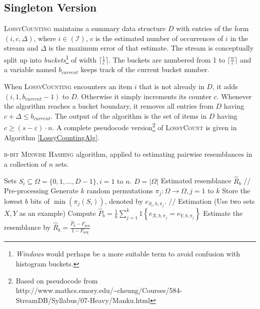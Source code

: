\documentclass[a4paper]{article}
\begin{document}
\subsection{Singleton Version}

\textsc{LossyCounting} maintains a summary data structure $D$ with entries of the form $(i, c, \Delta)$, where $i \in \mathcal{(I)}$, $c$ is the estimated number of occurrences of $i$ in the stream and $\Delta$ is the maximum error of that estimate. The stream is conceptually split up into \textit{buckets}\footnote{\textit{Windows} would perhaps be a more suitable term to avoid confusion with histogram buckets.} of width $\lceil \frac{1}{\varepsilon} \rceil$. The buckets are numbered from 1 to $\lceil \frac{n}{\varepsilon} \rceil$ and a variable named $b_{current}$ keeps track of the current bucket number.

When \textsc{LossyCounting} encounters an item $i$ that is not already in $D$, it adds $(i, 1, b_{current} - 1)$ to $D$. Otherwise it simply increments its counter $c$. Whenever the algorithm reaches a bucket boundary, it removes all entries from $D$ having $c + \Delta \leq b_{current}$. The output of the algorithm is the set of items in $D$ having $c \geq (s-\varepsilon)\cdot n$. A complete pseudocode version\footnote{Based on pseudocode from http://www.mathcs.emory.edu/\textasciitilde cheung/Courses/584-StreamDB/Syllabus/07-Heavy/Manku.html} of \textsc{LossyCount} is given in Algorithm \ref{LossyCountingAlg}.

\begin{algorithm}[H]
\caption{\textsc{b-bit Minwise Hashing} algorithm, applied to estimating pairwise resemblances in a collection of $n$ sets.}
\label{MinwiseHashingAlg}
\begin{algorithmic}
\Require Sets $S_i \subseteq \Omega = \{0,1,\ldots,D-1\}, i = 1 \text{ to } n$. \Comment $D = \left| \Omega \right|$
\Ensure Estimated resemblance $\hat{R}_b$
\State // Pre-processing
\State Generate $k$ random permutations $\pi_j: \Omega\longrightarrow\Omega, j=1\text{ to }k$
	\State Store the lowest $b$ bits of $\min(\pi_j(S_i))$, denoted by $e_{S_i,b,\pi_j}$.
\EndFor
\State
\State // Estimation (Use two sets $X,Y$ as an example)
\State Compute $\hat{P}_b = \frac{1}{k}\sum_{j=1}^k 1 \left\lbrace  e_{X,b,\pi_j } = e_{Y,b,\pi_j } \right\rbrace$
\State Estimate the resemblance by $\hat{R}_b = \frac{\hat{P}_b-F_{\text{pos}}}{1-F_{\text{neg}}}$
\end{algorithmic}
\end{algorithm}
\end{document}
